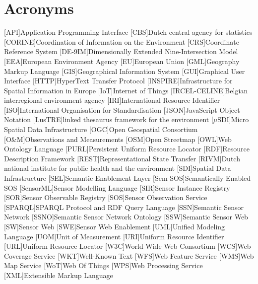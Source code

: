 \chapter*{Acronyms}

\begin{acronym}[UML]
  [API]{Application Programming Interface}
  [CBS]{Dutch central agency for statistics}
  [CORINE]{Coordination of Information on the Environment} 
  [CRS]{Coordinate Reference System} 
  [DE-9IM]{Dimensionally Extended Nine-Intersection Model}
  [EEA]{European Environment Agency}
  [EU]{European Union}
  [GML]{Geography Markup Language}
  [GIS]{Geographical Information System}
  [GUI]{Graphical User Interface}
  [HTTP]{HyperText Transfer Protocol}
  [INSPIRE]{Infrastructure for Spatial Information in Europe}
  [IoT]{Internet of Things}
  [IRCEL-CELINE]{Belgian interregional environment agency}
  [IRI]{International Resource Identifier}
  [ISO]{International Organisation for Standardisation}
  [JSON]{JavaScript Object Notation}
  [LusTRE]{linked thesaurus framework for the environment} 
  [$\mu$SDI]{Micro Spatial Data Infrastructure}
  [OGC]{Open Geospatial Consortium}
  [O\&M]{Observations and Measurements}
  [OSM]{Open Streetmap}
  [OWL]{Web Ontology Language}
  [PURL]{Persistent Uniform Resource Locator}
  [RDF]{Resource Description Framework}
  [REST]{Representational State Transfer}
  [RIVM]{Dutch national institute for public health and the environment}
  [SDI]{Spatial Data Infrastructure}
  [SEL]{Semantic Enablement Layer}
  [Sem-SOS]{Semantically Enabled SOS}
  [SensorML]{Sensor Modelling Language}
  [SIR]{Sensor Instance Registry}
  [SOR]{Sensor Observable Registry}
  [SOS]{Sensor Observation Service}
  [SPARQL]{SPARQL Protocol and RDF Query Language}
  [SSN]{Semantic Sensor Network}
  [SSNO]{Semantic Sensor Network Ontology}
  [SSW]{Semantic Sensor Web}
  [SW]{Sensor Web}
  [SWE]{Sensor Web Enablement}
  [UML]{Unified Modeling Language}
  [UOM]{Unit of Measurement}
  [URI]{Uniform Resource Identifier}
  [URL]{Uniform Resource Locator}
  [W3C]{World Wide Web Consortium}
  [WCS]{Web Coverage Service}
  [WKT]{Well-Known Text}
  [WFS]{Web Feature Service}
  [WMS]{Web Map Service}
  [WoT]{Web Of Things}
  [WPS]{Web Processing Service}
  [XML]{Extensible Markup Language}
\end{acronym}
